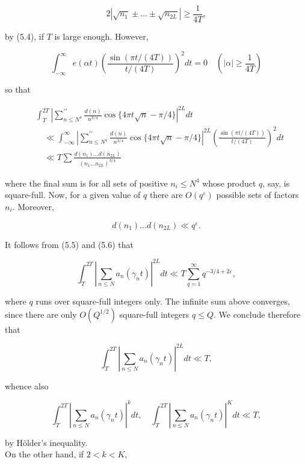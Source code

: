 \documentclass[10pt]{article}
\begin{document}
$$
2\left|\sqrt{n_{1}} \pm \ldots \pm \sqrt{n_{2 L}}\right| \geq \frac{1}{4T},
$$

by (5.4), if $T$ is large enough. However,

$$
\int_{-\infty}^{\infty} e(\alpha t)\left(\frac{\sin\left(\pi t/(4T)\right)}{t/(4T)}\right)^{2} d t=0 \quad\left(|\alpha| \geq \frac{1}{4T}\right)
$$

so that


\begin{align*}
& \int_{T}^{2 T}\left|\sum_{n \leq N^{4}}^{\prime \prime} \frac{d(n)}{n^{3 / 4}} \cos \{4 \pi t \sqrt{n}-\pi / 4\}\right|^{2 L} d t  \tag{5.6}\\
& \quad \ll \int_{-\infty}^{\infty}\left|\sum_{n \leq N^{4}}^{\prime \prime} \frac{d(n)}{n^{3 / 4}} \cos \{4 \pi t \sqrt{n}-\pi / 4\}\right|^{2 L}\left(\frac{\sin\left(\pi t/(4T)\right)}{t/(4T)}\right)^{2} d t \\
& \quad \ll T \sum \frac{d\left(n_{1}\right) \ldots d\left(n_{2 L}\right)}{\left(n_{1} \ldots n_{2 L}\right)^{3 / 4}}
\end{align*}


where the final sum is for all sets of positive $n_{i} \leq N^{4}$ whose product $q$, say, is square-full. Now, for a given value of $q$ there are $O\left(q^{\varepsilon}\right)$ possible sets of factors $n_{i}$. Moreover,

$$
d\left(n_{1}\right) \ldots d\left(n_{2 L}\right) \ll q^{\varepsilon} .
$$

It follows from (5.5) and (5.6) that

$$
\int_{T}^{2 T}\left|\sum_{n \leq N} a_{n}\left(\gamma_{n} t\right)\right|^{2 L} d t \ll T \sum_{q=1}^{\infty} q^{-3 / 4+2 \varepsilon},
$$

where $q$ runs over square-full integers only. The infinite sum above converges, since there are only $O\left(Q^{1 / 2}\right)$ square-full integers $q \leq Q$. We conclude therefore that

$$
\int_{T}^{2 T}\left|\sum_{n \leq N} a_{n}\left(\gamma_{n}t\right)\right|^{2 L} d t \ll T,
$$

whence also


\begin{equation*}
\int_{T}^{2 T}\left|\sum_{n \leq N} a_{n}\left(\gamma_{n}t\right)\right|^{k} d t, \quad \int_{T}^{2 T}\left|\sum_{n \leq N} a_{n}\left(\gamma_{n}t\right)\right|^{K} d t \ll T, \tag{5.7}
\end{equation*}


by Hölder's inequality.\\
On the other hand, if $2<k<K$,
\end{document}
